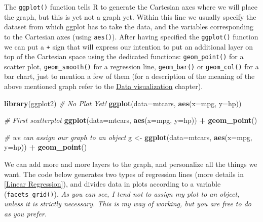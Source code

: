 \documentclass[
]{article}
\newenvironment{Shaded}{\begin{snugshade}}{\end{snugshade}}
\newcommand{\AttributeTok}[1]{\textcolor[rgb]{0.13,0.29,0.53}{#1}}
\newcommand{\CommentTok}[1]{\textcolor[rgb]{0.56,0.35,0.01}{\textit{#1}}}
\newcommand{\FunctionTok}[1]{\textcolor[rgb]{0.13,0.29,0.53}{\textbf{#1}}}
\newcommand{\NormalTok}[1]{#1}
\newcommand{\OtherTok}[1]{\textcolor[rgb]{0.56,0.35,0.01}{#1}}
\newcommand{\SpecialCharTok}[1]{\textcolor[rgb]{0.81,0.36,0.00}{\textbf{#1}}}
\begin{document}
The \texttt{ggplot()} function tells R to generate the Cartesian axes where we
will place the graph, but this is yet not a graph yet. Within this line
we usually specify the dataset from which ggplot has to take the data,
and the variables corresponding to the Cartesian axes (using \texttt{aes()}).
After having specified the \texttt{ggplot()} function we can put a \texttt{+} sign
that will express our intention to put an additional layer on top of the
Cartesian space using the dedicated functions: \texttt{geom\_point()} for a
scatter plot, \texttt{geom\_smooth()} for a regression line, \texttt{geom\_bar()} or
\texttt{geom\_col()} for a bar chart, just to mention a few of them (for a
description of the meaning of the above mentioned graph refer to the
\protect\hyperlink{data-visualization}{Data visualization} chapter).

\begin{Shaded}
\begin{Highlighting}[]
\FunctionTok{library}\NormalTok{(ggplot2)}
\CommentTok{\# No Plot Yet!}
\FunctionTok{ggplot}\NormalTok{(}\AttributeTok{data=}\NormalTok{mtcars, }\FunctionTok{aes}\NormalTok{(}\AttributeTok{x=}\NormalTok{mpg, }\AttributeTok{y=}\NormalTok{hp))}

\CommentTok{\# First scatterplot}
\FunctionTok{ggplot}\NormalTok{(}\AttributeTok{data=}\NormalTok{mtcars, }\FunctionTok{aes}\NormalTok{(}\AttributeTok{x=}\NormalTok{mpg, }\AttributeTok{y=}\NormalTok{hp)) }\SpecialCharTok{+} 
  \FunctionTok{geom\_point}\NormalTok{()}

\CommentTok{\# we can assign our graph to an object}
\NormalTok{g }\OtherTok{\textless{}{-}} \FunctionTok{ggplot}\NormalTok{(}\AttributeTok{data=}\NormalTok{mtcars, }\FunctionTok{aes}\NormalTok{(}\AttributeTok{x=}\NormalTok{mpg, }\AttributeTok{y=}\NormalTok{hp)) }\SpecialCharTok{+} 
  \FunctionTok{geom\_point}\NormalTok{()}
\end{Highlighting}
\end{Shaded}

We can add more and more layers to the graph, and personalize all the
things we want. The code below generates two types of regression lines
(more details in {[}\protect\hyperlink{linear-regression}{Linear Regression}{]}), and divides data in plots
according to a variable (\texttt{facets\_grid()}). \emph{As you can see, I tend not
to assign my plot to an object, unless it is strictly necessary. This is
my way of working, but you are free to do as you prefer.}
\end{document}
